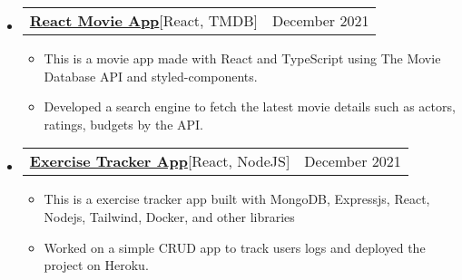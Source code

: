 \documentclass[letterpaper,11pt]{article}
\makeatletter
\newcommand{\resumeItem}[1]{
    \item\small{
      {#1 \vspace{-2pt}}
    }
  }
\newcommand{\resumeProjectHeading}[2]{
      \item
      \begin{tabular*}{0.97\textwidth}{l@{\extracolsep{\fill}}r}
        \small#1 & #2 \\
      \end{tabular*}\vspace{-7pt}
  }
\newcommand{\resumeSubHeadingListStart}{\begin{itemize}[leftmargin=0.15in, label={}]}
\newcommand{\resumeSubHeadingListEnd}{\end{itemize}}
\newcommand{\resumeItemListStart}{\begin{itemize}}
\newcommand{\resumeItemListEnd}{\end{itemize}\vspace{-5pt}}
\makeatother
\begin{document}
\resumeSubHeadingListStart
\resumeProjectHeading
{\textbf{\href{https://github.com/ayushsoni1010/react-movie-app}{React Movie App}}{{[React, TMDB]}}}{December 2021}
\resumeItemListStart
\resumeItem{This is a movie app made with React and TypeScript using The Movie Database API and styled-components.}
\resumeItem{Developed a search engine to fetch the latest movie details such as actors, ratings, budgets by the API.}
\resumeItemListEnd
\resumeSubHeadingListEnd

\resumeSubHeadingListStart
\resumeProjectHeading
{\textbf{\href{https://github.com/ayushsoni1010/react-movie-app}{Exercise Tracker App}}{{[React, NodeJS]}}}{December 2021}
\resumeItemListStart
\resumeItem{This is a exercise tracker app built with MongoDB, Expressjs, React, Nodejs, Tailwind, Docker, and other libraries}
\resumeItem{Worked on a simple CRUD app to track users logs and deployed the project on Heroku.}
\resumeItemListEnd
\resumeSubHeadingListEnd
\end{document}
